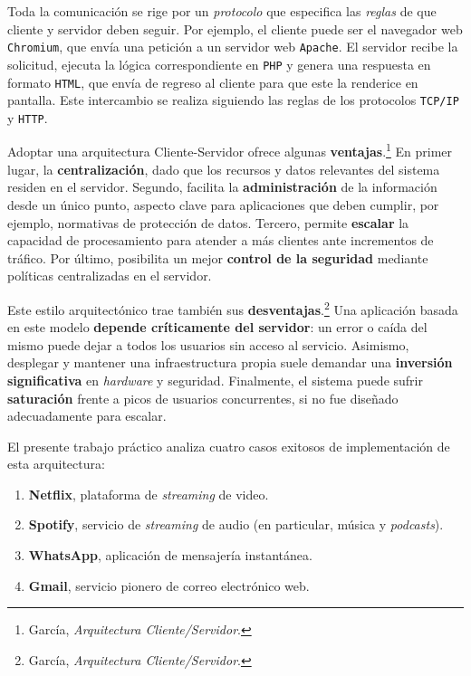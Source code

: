 \documentclass[
  spanish,
  11pt,
]{article}
\providecommand{\tightlist}{%
  \setlength{\itemsep}{0pt}\setlength{\parskip}{0pt}}
\begin{document}
Toda la comunicación se rige por un \emph{protocolo} que especifica las
\emph{reglas} de que cliente y servidor deben seguir. Por ejemplo, el
cliente puede ser el navegador web \texttt{Chromium}, que envía una
petición a un servidor web \texttt{Apache}. El servidor recibe la
solicitud, ejecuta la lógica correspondiente en \texttt{PHP} y genera
una respuesta en formato \texttt{HTML}, que envía de regreso al cliente
para que este la renderice en pantalla. Este intercambio se realiza
siguiendo las reglas de los protocolos \texttt{TCP/IP} y \texttt{HTTP}.

Adoptar una arquitectura Cliente-Servidor ofrece algunas
\textbf{ventajas}.\footnote{García, \emph{Arquitectura
  Cliente/Servidor}.} En primer lugar, la \textbf{centralización}, dado
que los recursos y datos relevantes del sistema residen en el servidor.
Segundo, facilita la \textbf{administración} de la información desde un
único punto, aspecto clave para aplicaciones que deben cumplir, por
ejemplo, normativas de protección de datos. Tercero, permite
\textbf{escalar} la capacidad de procesamiento para atender a más
clientes ante incrementos de tráfico. Por último, posibilita un mejor
\textbf{control de la seguridad} mediante políticas centralizadas en el
servidor.

Este estilo arquitectónico trae también sus
\textbf{desventajas}.\footnote{García, \emph{Arquitectura
  Cliente/Servidor}.} Una aplicación basada en este modelo
\textbf{depende críticamente del servidor}: un error o caída del mismo
puede dejar a todos los usuarios sin acceso al servicio. Asimismo,
desplegar y mantener una infraestructura propia suele demandar una
\textbf{inversión significativa} en \emph{hardware} y seguridad.
Finalmente, el sistema puede sufrir \textbf{saturación} frente a picos
de usuarios concurrentes, si no fue diseñado adecuadamente para escalar.

El presente trabajo práctico analiza cuatro casos exitosos de
implementación de esta arquitectura:

\begin{enumerate}
\def\labelenumi{\arabic{enumi}.}
\tightlist
\item
  \textbf{Netflix}, plataforma de \emph{streaming} de video.
\item
  \textbf{Spotify}, servicio de \emph{streaming} de audio (en
  particular, música y \emph{podcasts}).
\item
  \textbf{WhatsApp}, aplicación de mensajería instantánea.
\item
  \textbf{Gmail}, servicio pionero de correo electrónico web.
\end{enumerate}
\end{document}
